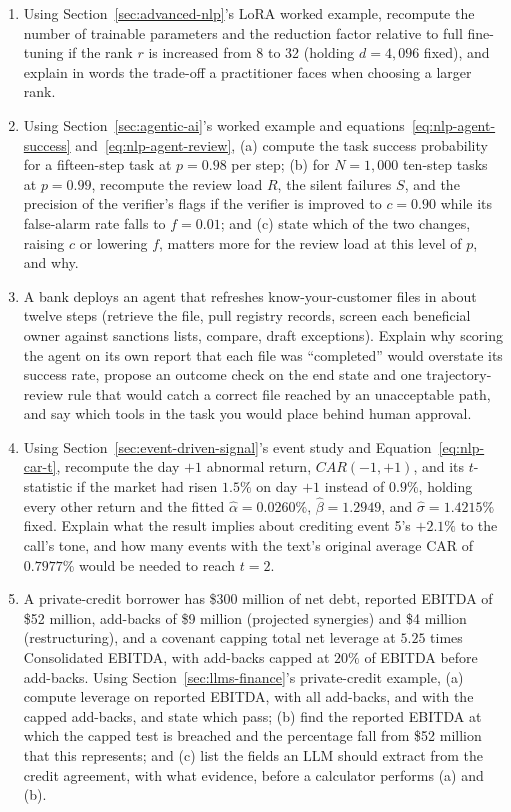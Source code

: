 \documentclass[../ai_in_finance]{subfiles}
\begin{document}
\begin{enumerate}[exercises]
    \item Using Section~\ref{sec:advanced-nlp}'s LoRA worked example, recompute the number of trainable parameters and the reduction factor relative to full fine-tuning if the rank $r$ is increased from 8 to 32 (holding $d=4{,}096$ fixed), and explain in words the trade-off a practitioner faces when choosing a larger rank.
    \item Using Section~\ref{sec:agentic-ai}'s worked example and equations~\eqref{eq:nlp-agent-success} and~\eqref{eq:nlp-agent-review}, (a) compute the task success probability for a fifteen-step task at $p = 0.98$ per step; (b) for $N = 1{,}000$ ten-step tasks at $p = 0.99$, recompute the review load $R$, the silent failures $S$, and the precision of the verifier's flags if the verifier is improved to $c = 0.90$ while its false-alarm rate falls to $f = 0.01$; and (c) state which of the two changes, raising $c$ or lowering $f$, matters more for the review load at this level of $p$, and why.
    \item A bank deploys an agent that refreshes know-your-customer files in about twelve steps (retrieve the file, pull registry records, screen each beneficial owner against sanctions lists, compare, draft exceptions). Explain why scoring the agent on its own report that each file was ``completed'' would overstate its success rate, propose an outcome check on the end state and one trajectory-review rule that would catch a correct file reached by an unacceptable path, and say which tools in the task you would place behind human approval.
    \item Using Section~\ref{sec:event-driven-signal}'s event study and Equation~\eqref{eq:nlp-car-t}, recompute the day $+1$ abnormal return, $CAR(-1,+1)$, and its $t$-statistic if the market had risen $1.5\%$ on day $+1$ instead of $0.9\%$, holding every other return and the fitted $\hat\alpha = 0.0260\%$, $\hat\beta = 1.2949$, and $\hat\sigma = 1.4215\%$ fixed. Explain what the result implies about crediting event 5's $+2.1\%$ to the call's tone, and how many events with the text's original average CAR of $0.7977\%$ would be needed to reach $t = 2$.
    \item A private-credit borrower has \$300 million of net debt, reported EBITDA of \$52 million, add-backs of \$9 million (projected synergies) and \$4 million (restructuring), and a covenant capping total net leverage at $5.25$ times Consolidated EBITDA, with add-backs capped at $20\%$ of EBITDA before add-backs. Using Section~\ref{sec:llms-finance}'s private-credit example, (a) compute leverage on reported EBITDA, with all add-backs, and with the capped add-backs, and state which pass; (b) find the reported EBITDA at which the capped test is breached and the percentage fall from \$52 million that this represents; and (c) list the fields an LLM should extract from the credit agreement, with what evidence, before a calculator performs (a) and (b).

\end{enumerate}
\end{document}

